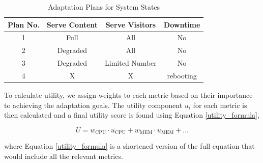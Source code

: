 \documentclass[conference]{IEEEtran}
\begin{document}
\begin{itemize}
\begin{itemize}
                    \begin{table}[ht]
                        \centering
                        \caption{Adaptation Plans for System States}
                        \label{tab:adaptation-plans}
                        \small
                        \begin{tabular}{cccc}
                            \toprule
                            \textbf{Plan No.} & \textbf{Serve Content} & \textbf{Serve Visitors} & \textbf{Downtime} \\
                            \midrule
                            1                 & Full                   & All                     & No                \\
                            2                 & Degraded               & All                     & No                \\
                            3                 & Degraded               & Limited Number          & No                \\
                            4                 & X                      & X                       & rebooting         \\
                            \bottomrule
                        \end{tabular}
                    \end{table}

                    To calculate utility, we assign weights to each metric based on their importance to achieving the adaptation goals. The utility component \( u_i \) for each metric is then calculated and a final utility score is found using Equation \ref{utility_formula},

                    \begin{equation}
                        U = w_{\text{CPU}} \cdot u_{\text{CPU}} + w_{\text{MEM}} \cdot u_{\text{MEM}}+ ...
                        \label{utility_formula}
                    \end{equation}

                    where Equation \ref{utility_formula} is a shortened version of the full equation that would include all the relevant metrics.


\end{itemize}
\end{itemize}
\end{document}
